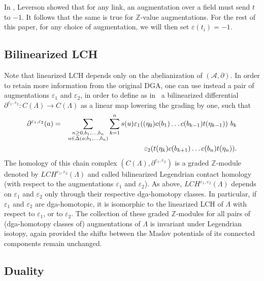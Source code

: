\documentclass[11pt]{amsart}
\theoremstyle{plain}
\theoremstyle{remark}
\numberwithin{equation}{section}
\newcommand{\Z}{\ensuremath{\mathbb{Z}}}
\begin{document}
In \cite{L}, Leverson showed that for any link, an augmentation over a field must send $t$ to $-1$. It follows that the same is true for $\Z$-value augmentations. For the rest of this paper, for any choice of augmentation, we will then set $\varepsilon(t_i)=-1$.


\subsection{Bilinearized LCH}
\label{sec:bLCH}

Note that linearized LCH depends only on the abelianization of $(\mathcal{A}, \partial)$. In order to retain more information from the original DGA, one can use instead
a pair of augmentations $\varepsilon_1$ and $\varepsilon_2$, in order to define as in~\cite{BC} a bilinearized differential $\partial^{\varepsilon_1, \varepsilon_2}: C(\Lambda) \to C(\Lambda)$ as a linear map lowering the grading by one, such that
\begin{eqnarray*}
\partial^{\varepsilon_1, \varepsilon_2} (a) &=& \sum_{\substack{n \ge 0, b_1, \ldots, b_n \\ u \in \Delta(a;b_1, \ldots, b_n)}} \sum_{k=1}^n s(u)
\varepsilon_1((\eta_0) c(b_1) \ldots c(b_{k-1}) t(\eta_{k-1})) \ b_k \\ 
&& \hspace{3.5cm} \varepsilon_2(t(\eta_k) c(b_{k+1}) \ldots c(b_n) t(\eta_n)).
\end{eqnarray*}
The homology of this chain complex $(C(\Lambda), \partial^{\varepsilon_1, \varepsilon_2})$ is a graded $\Z$-module denoted by 
$LCH^{\varepsilon_1, \varepsilon_2}(\Lambda)$ and called bilinearized Legendrian contact homology (with respect to the augmentations $\varepsilon_1$ and 
$\varepsilon_2$). As above, $LCH^{\varepsilon_1, \varepsilon_2}(\Lambda)$ depends on $\varepsilon_1$ and $\varepsilon_2$ only through their respective dga-homotopy classes. In particular, if $\varepsilon_1$ and $\varepsilon_2$ are dga-homotopic, it is isomorphic to the linearized LCH of $\Lambda$ with respect to
$\varepsilon_1$, or to $\varepsilon_2$. The collection of these graded $\Z$-modules for all pairs of (dga-homotopy classes of) augmentations of $\Lambda$ is 
invariant under Legendrian isotopy, again provided the shifts between the Maslov potentials of its connected components remain unchanged.


\subsection{Duality}
\label{sec:duality}
\end{document}
